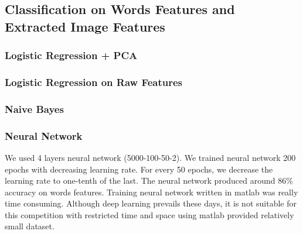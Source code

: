 \subsection{Classification on Words Features and Extracted Image Features}
\subsubsection{Logistic Regression + PCA}
\subsubsection{Logistic Regression on Raw Features}
\subsubsection{Naive Bayes}
\subsubsection{Neural Network}
We used 4 layers neural network (5000-100-50-2). We trained neural network 200 epochs with decreasing learning rate. For every 50 epochs, we decrease the learning rate to one-tenth of the last. The neural network produced around 86\% accuracy on words features. Training neural network written in matlab was really time consuming. Although deep learning prevails these days, it is not suitable for this competition with restricted time and space using matlab provided relatively small dataset. 
